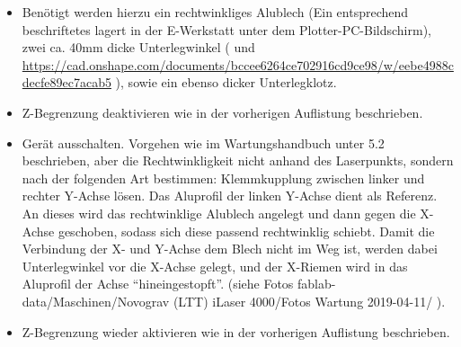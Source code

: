 \documentclass{\basedir/fablab-document}
\renewcommand{\todo}[1]{\textbf{\color{red}{TODO: #1}}}
\begin{document}
\begin{itemize}
	\item Benötigt werden hierzu ein rechtwinkliges Alublech (Ein entsprechend beschriftetes lagert in der E-Werkstatt unter dem Plotter-PC-Bildschirm), zwei ca. 40mm dicke Unterlegwinkel (\todo{noch zu fertigen, siehe Fotos fablab-data/Maschinen/Novograv (LTT) iLaser 4000/Fotos Wartung 2019-04-11/ } und \url{https://cad.onshape.com/documents/bccee6264ce702916cd9ce98/w/eebe4988cdecfe89ec7acab5} ), sowie ein ebenso dicker Unterlegklotz.

	\item Z-Begrenzung deaktivieren wie in der vorherigen Auflistung beschrieben.

	\item Gerät ausschalten. Vorgehen wie im Wartungshandbuch unter 5.2 beschrieben, aber die Rechtwinkligkeit nicht anhand des Laserpunkts, sondern nach der folgenden Art bestimmen: Klemmkupplung zwischen linker und rechter Y-Achse lösen. Das Aluprofil der linken Y-Achse dient als Referenz. An dieses wird das rechtwinklige Alublech angelegt und dann gegen die X-Achse geschoben, sodass sich diese passend rechtwinklig schiebt. Damit die Verbindung der X- und Y-Achse dem Blech nicht im Weg ist, werden dabei Unterlegwinkel vor die X-Achse gelegt, und der X-Riemen wird in das Aluprofil der Achse \enquote{hineingestopft}. (siehe Fotos fablab-data/Maschinen/Novograv (LTT) iLaser 4000/Fotos Wartung 2019-04-11/ ).

	\item Z-Begrenzung wieder aktivieren wie in der vorherigen Auflistung beschrieben.
\end{itemize}
\end{document}
